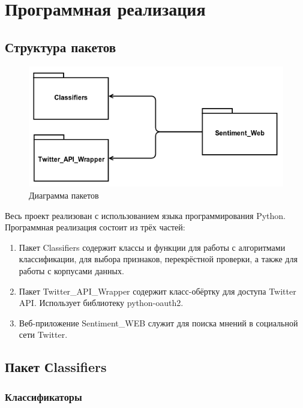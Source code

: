\section{Программная реализация}

\subsection{Структура пакетов}

\begin{figure}[!h]
\begin{center}
\includegraphics[scale=0.6, clip]{../resources/uml/packages.png}
\caption{Диаграмма пакетов}
\label{gr:packages}
\end{center}
\end{figure} 

Весь проект реализован с использованием языка программирования Python. Программная реализация состоит из трёх частей:
\begin{enumerate}
\item 
Пакет Classifiers содержит классы и функции для работы с
алгоритмами классификации, для выбора признаков,
перекрёстной проверки, а также для работы с корпусами данных.

\item 
Пакет Twitter\_API\_Wrapper содержит класс-обёртку для 
доступа Twitter API. Использует библиотеку python-oauth2.

\item 
Веб-приложение Sentiment\_WEB служит для поиска
мнений в социальной сети Twitter. 
\end{enumerate}

\subsection{Пакет Сlassifiers}

\subsubsection{Классификаторы}

